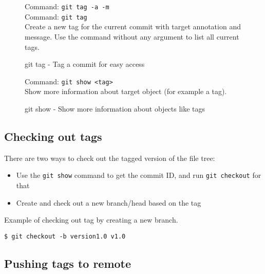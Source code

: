 \documentclass[../main/git_course_main.tex]{subfiles}
\begin{document}
\begin{figure}[h!]
\begin{bluebox}
Command: \verb$git tag -a -m$ \\
Command: \verb$git tag$ \\

Create a new tag for the current commit with target annotation and message.
Use the command without any argument to list all current tags.
\end{bluebox}
\label{command:tag}
\caption{git tag - Tag a commit for easy access}
\end{figure}

\begin{figure}[h!]
\begin{bluebox}
Command: \verb$git show <tag>$ \\

Show more information about target object (for example a tag).
\end{bluebox}
\label{command:tag}
\caption{git show - Show more information about objects like tags}
\end{figure}

\subsection{Checking out tags}

There are two ways to check out the tagged version of the file tree:

\begin{itemize}
	\item Use the \verb$git show$ command to get the commit ID, and run \verb$git checkout$ for that
	\item Create and check out a new branch/head based on the tag
\end{itemize}

Example of checking out tag by creating a new branch.

\begin{codebox}
\begin{lstlisting}
$ git checkout -b version1.0 v1.0
\end{lstlisting}
\end{codebox}

\subsection{Pushing tags to remote}
\end{document}
